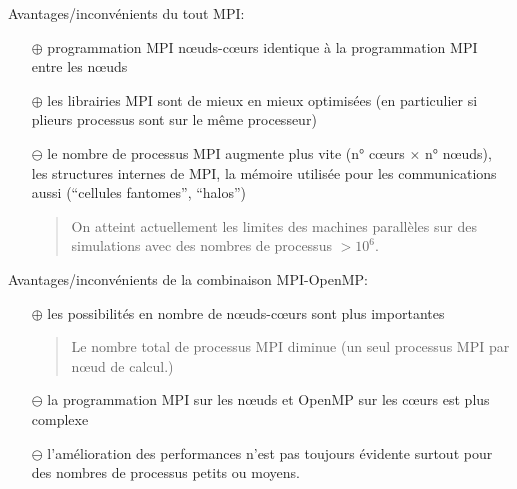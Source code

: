 \documentclass{beamer}
\begin{document}
\begin{frame}
	
\vfill

Avantages/inconvénients du tout MPI:
	
\vfill
\begin{itemize}
	\item[\LARGE $\mathbf\oplus$] programmation MPI n\oe uds-c\oe urs identique à la programmation MPI entre les n\oe uds
	\vfill
	
	\item[\LARGE $\mathbf\oplus$] les librairies MPI sont de mieux en mieux optimisées (en particulier si plieurs processus sont sur le même processeur)
	
\vfill
	\item[\LARGE $\mathbf\ominus$] le nombre de processus MPI augmente plus vite (n° c\oe urs $\times$ n° n\oe uds), les structures internes de MPI, la mémoire utilisée pour les communications aussi (``cellules fantomes'', ``halos'')
	\bigskip
	
\bigskip

	\begin{quote}
On atteint actuellement les limites des machines parallèles sur des simulations avec des nombres de processus $> 10^6$.
	\end{quote}
	
\end{itemize}
\vfill
\end{frame}

\begin{frame}


\vfill
	Avantages/inconvénients de la combinaison MPI-OpenMP:
	
\vfill
	\begin{itemize}
		\item[\LARGE $\mathbf\oplus$] les possibilités en nombre de n\oe uds-c\oe urs sont plus importantes
		
\begin{quotation}\noindent%
Le nombre total de processus MPI diminue (un seul processus MPI par n\oe ud de calcul.)
\end{quotation}
	
\vfill
		\item[\LARGE $\mathbf\ominus$] la programmation MPI sur les n\oe uds et OpenMP sur les c\oe urs est plus complexe
	
\vfill
		\item[\LARGE $\mathbf\ominus$] l'amélioration des performances n'est pas toujours évidente surtout pour des nombres de processus petits ou moyens.
	\end{itemize}
	
	\vfill
\end{frame}
\end{document}
